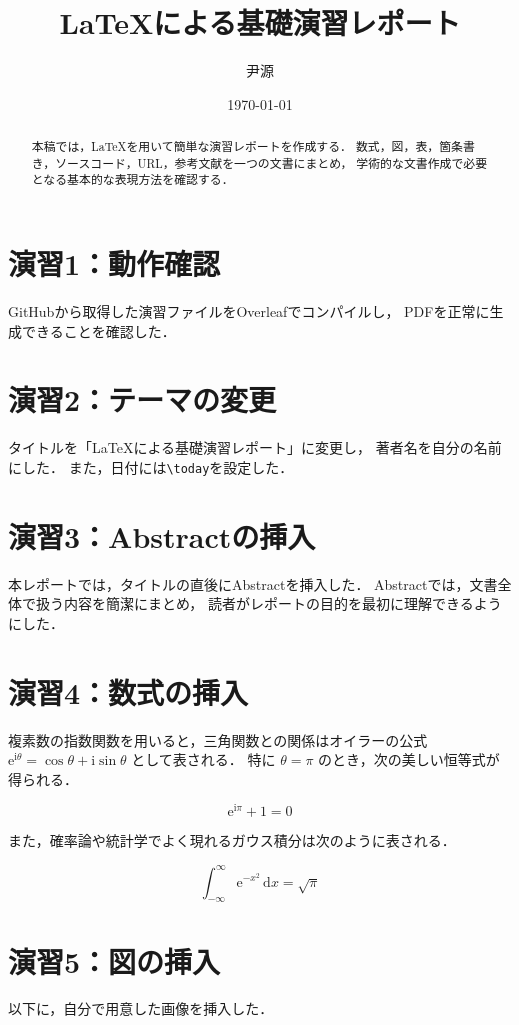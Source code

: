 ﻿\documentclass[a4paper,twocolumn]{jsarticle}
\title{%
LaTeXによる基礎演習レポート
}
\author{尹源}
\date{\today}
\newcommand{\dif}{\mathrm{d}}
\newcommand{\ee}{\mathrm{e}}
\newcommand{\ii}{\mathrm{i}}
\begin{document}
\maketitle

\begin{abstract}
本稿では，LaTeXを用いて簡単な演習レポートを作成する．
数式，図，表，箇条書き，ソースコード，URL，参考文献を一つの文書にまとめ，
学術的な文書作成で必要となる基本的な表現方法を確認する．
\end{abstract}

\section*{演習1：動作確認}
GitHubから取得した演習ファイルをOverleafでコンパイルし，
PDFを正常に生成できることを確認した．

\section*{演習2：テーマの変更}
タイトルを「LaTeXによる基礎演習レポート」に変更し，
著者名を自分の名前にした．
また，日付には\verb|\today|を設定した．

\section*{演習3：Abstractの挿入}
本レポートでは，タイトルの直後にAbstractを挿入した．
Abstractでは，文書全体で扱う内容を簡潔にまとめ，
読者がレポートの目的を最初に理解できるようにした．

\section*{演習4：数式の挿入}
複素数の指数関数を用いると，三角関数との関係はオイラーの公式
$\ee^{\ii\theta}=\cos\theta+\ii\sin\theta$ として表される．
特に $\theta=\pi$ のとき，次の美しい恒等式が得られる．

\begin{equation}
\ee^{\ii\pi}+1=0
\label{eq:euler_identity}
\end{equation}

また，確率論や統計学でよく現れるガウス積分は次のように表される．

\begin{equation}
\int_{-\infty}^{\infty}\ee^{-x^2}\,\dif x=\sqrt{\pi}
\label{eq:gaussian_integral}
\end{equation}

\section*{演習5：図の挿入}
以下に，自分で用意した画像を挿入した．
\end{document}

